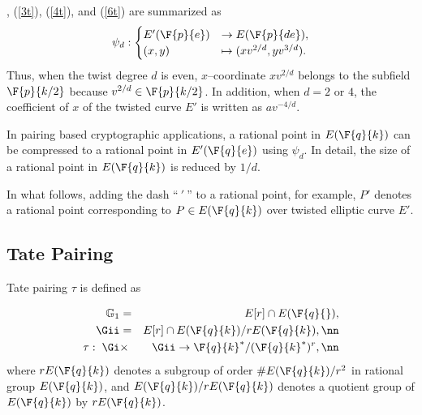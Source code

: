 
, (\ref{3t}), (\ref{4t}), and (\ref{6t}) are summarized as
\begin{eqnarray}
\psi_d : 
\begin{cases}
E'(\F{p}{e}) & \rightarrow  E(\F{p}{de}), \\
(x,y) & \mapsto (xv^{2/d},yv^{3/d}).
\end{cases} \label{gt}
\end{eqnarray}
Thus, when the twist degree $d$ is even, $x$--coordinate $xv^{2/d}$ belongs to the subfield $\F{p}{k/2}$ because $v^{2/d}\in \F{p}{k/2}$. In addition, when $d=2$ or $4$, the coefficient of $x$ of the twisted curve $E'$ is written as $av^{-4/d}$.

In pairing based cryptographic applications, a rational point in $E(\F{q}{k})$ can be compressed to a rational point in $E'(\F{q}{e})$ using $\psi_d$.
In detail, the size of a rational point in $E(\F{q}{k})$ is reduced by $1/d$.

In what follows, adding the dash ``$\ '\ $'' to a rational point, for example, $P'$ denotes a rational point corresponding to $P \in E(\F{q}{k})$ over twisted elliptic curve $E'$.

\subsection{Tate Pairing}
Tate pairing $\tau$ is defined as 

\begin{eqnarray}
\mathbb{G}_1 &=& E[r]\cap E(\F{q}{}), \nonumber \\
\Gii &=& E[r]\cap E(\F{q}{k})/rE(\F{q}{k}), \nn \\
\tau:\;\Gi &\times& \Gii \rightarrow \F{q}{k}^*/(\F{q}{k}^*)^r, \nn
\end{eqnarray}
where $rE(\F{q}{k})$ denotes a subgroup of order $\#E(\F{q}{k})/r^2$ in rational group $E(\F{q}{k})$, and $E(\F{q}{k})/rE(\F{q}{k})$ denotes a quotient group of $E(\F{q}{k})$ by $rE(\F{q}{k})$.

